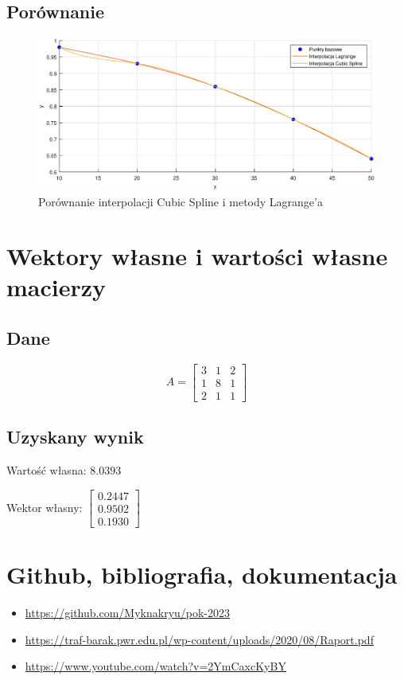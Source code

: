 \documentclass{article}
\begin{document}
\subsection{Porównanie}
\begin{figure}[H]
    \centering
    \includegraphics{newImg/compCSLg.eps}
    \caption{Porównanie interpolacji Cubic Spline i metody Lagrange'a}
    \label{fig:enter-label}
\end{figure}
\section{Wektory własne i wartości własne macierzy}
\subsection{Dane}
$$A = \begin{bmatrix}
    3 & 1 & 2 \\
    1 & 8 & 1 \\
    2 & 1 & 1
\end{bmatrix}$$
\subsection{Uzyskany wynik}
\begin{itemize}
    \begin{multicols}{2}
    \item Wartość własna: $8.0393$ 
    \par
    \item Wektor własny: $\begin{bmatrix} 0.2447 \\ 0.9502 \\ 0.1930\end{bmatrix}$
    \end{multicols}
\end{itemize}
\section{Github, bibliografia, dokumentacja}
\begin{itemize}
    \item \url{https://github.com/Myknakryu/pok-2023}
    \item \url{https://traf-barak.pwr.edu.pl/wp-content/uploads/2020/08/Raport.pdf}
    \item \url{https://www.youtube.com/watch?v=2YmCaxcKyBY}
\end{itemize}
\end{document}
